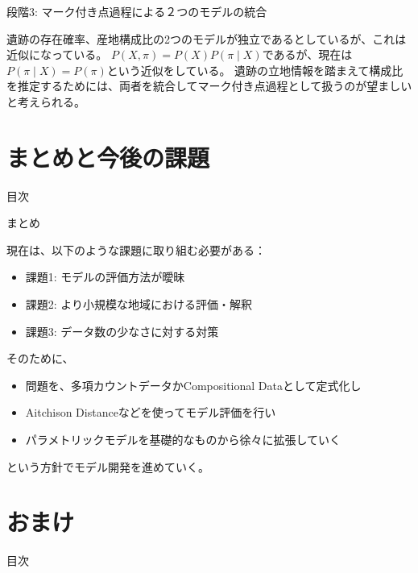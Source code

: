 \documentclass[xelatex, 8pt]{beamer}
\theoremstyle{plain}
\theoremstyle{definition}
\begin{document}
\begin{frame}{段階3: マーク付き点過程による２つのモデルの統合}

    遺跡の存在確率、産地構成比の2つのモデルが独立であるとしているが、これは近似になっている。
    $P(X, \pi) = P(X) P(\pi \mid X)$であるが、現在は$P(\pi \mid X) = P(\pi)$という近似をしている。
    遺跡の立地情報を踏まえて構成比を推定するためには、両者を統合してマーク付き点過程として扱うのが望ましいと考えられる。

\end{frame}

\section{まとめと今後の課題}

\begin{frame}
{\Large 目次}
 \tableofcontents[currentsection]
\end{frame}

\begin{frame}{まとめ}

    現在は、以下のような課題に取り組む必要がある：

    \begin{itemize}
        \item 課題1: モデルの評価方法が曖昧
        \item 課題2: より小規模な地域における評価・解釈
        \item 課題3: データ数の少なさに対する対策
    \end{itemize}

    そのために、

    \begin{itemize}
        \item 問題を、多項カウントデータかCompositional Dataとして定式化し
        \item Aitchison Distanceなどを使ってモデル評価を行い
        \item パラメトリックモデルを基礎的なものから徐々に拡張していく
    \end{itemize}

    という方針でモデル開発を進めていく。

\end{frame}

\section{おまけ}

\begin{frame}
{\Large 目次}
 \tableofcontents[currentsection]
\end{frame}
\end{document}

